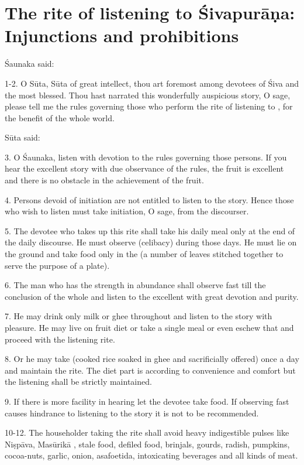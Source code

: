 \chapter{The rite of listening to Śivapurāṇa: Injunctions and prohibitions}

Śaunaka said:

1-2. O Sūta, Sūta of great intellect, thou art foremost among devotees of Śiva
and the most blessed. Thou hast narrated this wonderfully auspicious story, O
sage, please tell me the rules governing those who perform the rite of listening
to , for the benefit of the whole world.

Sūta said:

3. O Śaunaka, listen with devotion to the rules governing those persons. If you
hear the excellent story with due observance of the rules, the fruit is
excellent and there is no obstacle in the achievement of the fruit.

4. Persons devoid of initiation are not entitled to listen to the story. Hence
those who wish to listen must take initiation, O sage, from the discourser.

5. The devotee who takes up this rite shall take his daily meal only at the end
of the daily discourse. He must observe  (celibacy) during those
days. He must lie on the ground and take food only in the  (a
number of leaves stitched together to serve the purpose of a plate).

6. The man who has the strength in abundance shall observe fast till the
conclusion of the whole  and listen to the excellent 
with great devotion and purity.

7. He may drink only milk or ghee throughout and listen to the story with
pleasure. He may live on fruit diet or take a single meal or even eschew that
and proceed with the listening rite.

8. Or he may take  (cooked rice soaked in ghee and sacrificially
offered) once a day and maintain the rite. The diet part is according to
convenience and comfort but the listening shall be strictly maintained.

9. If there is more facility in hearing let the devotee take food. If observing
fast causes hindrance to listening to the story it is not to be recommended.

10-12. The householder taking the rite shall avoid heavy indigestible pulses
like Niṣpāva, Masūrikā \etc, stale food, defiled food, brinjals, gourds, radish,
pumpkins, cocoa-nuts, garlic, onion, asafoetida, intoxicating beverages and all
kinds of meat.

